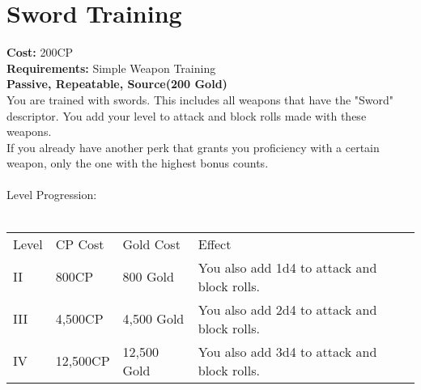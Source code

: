 \section{Sword Training}\label{perk:swordTraining}
\textbf{Cost:} 200CP\\
\textbf{Requirements:} Simple Weapon Training\\
\textbf{Passive, Repeatable, Source(200 Gold)}\\
You are trained with swords.
This includes all weapons that have the "Sword" descriptor.
You add your level to attack and block rolls made with these weapons.\\
If you already have another perk that grants you proficiency with a certain weapon, only the one with the highest bonus counts.\\
\\
Level Progression:\\
\\
\begin{tabular}{l | l | l | l}
	Level & CP Cost & Gold Cost & Effect\\
	II & 800CP & 800 Gold & You also add 1d4 to attack and block rolls.\\
	III & 4,500CP & 4,500 Gold & You also add 2d4 to attack and block rolls.\\
	IV & 12,500CP & 12,500 Gold & You also add 3d4 to attack and block rolls.\\
\end{tabular}
